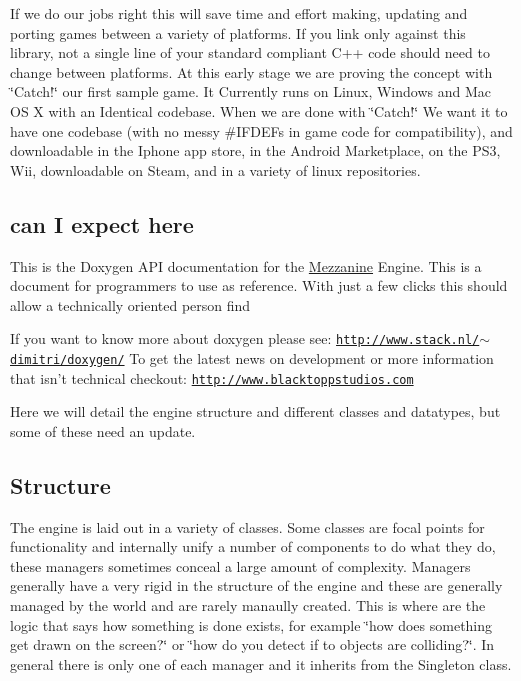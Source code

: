 If we do our jobs right this will save time and effort making, updating and porting games between a variety of platforms. If you link only against this library, not a single line of your standard compliant C++ code should need to change between platforms. At this early stage we are proving the concept with \char`\"{}Catch!\char`\"{} our first sample game. It Currently runs on Linux, Windows and Mac OS X with an Identical codebase. When we are done with \char`\"{}Catch!\char`\"{} We want it to have one codebase (with no messy \#IFDEFs in game code for compatibility), and downloadable in the Iphone app store, in the Android Marketplace, on the PS3, Wii, downloadable on Steam, and in a variety of linux repositories.\hypertarget{index_What}{}\subsection{can I expect here}\label{index_What}
This is the Doxygen API documentation for the \hyperlink{namespaceMezzanine}{Mezzanine} Engine. This is a document for programmers to use as reference. With just a few clicks this should allow a technically oriented person find

If you want to know more about doxygen please see: \href{http://www.stack.nl/~dimitri/doxygen/}{\tt http://www.stack.nl/$\sim$dimitri/doxygen/} To get the latest news on development or more information that isn't technical checkout: \href{http://www.blacktoppstudios.com}{\tt http://www.blacktoppstudios.com}

Here we will detail the engine structure and different classes and datatypes, but some of these need an update.\hypertarget{index_Engine}{}\subsection{Structure}\label{index_Engine}
The engine is laid out in a variety of classes. Some classes are focal points for functionality and internally unify a number of components to do what they do, these managers sometimes conceal a large amount of complexity. Managers generally have a very rigid in the structure of the engine and these are generally managed by the world and are rarely manaully created. This is where are the logic that says how something is done exists, for example \char`\"{}how does something get drawn on the screen?\char`\"{} or \char`\"{}how do you detect if to objects are colliding?\char`\"{}. In general there is only one of each manager and it inherits from the Singleton class.

